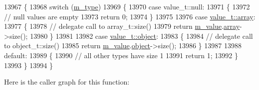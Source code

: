\begin{DoxyCode}
13967     \{
13968         \textcolor{keywordflow}{switch} (\hyperlink{classnlohmann_1_1basic__json_a91990b60d7d4d67968a2c1db677536e7}{m\_type})
13969         \{
13970             \textcolor{keywordflow}{case} value\_t::null:
13971             \{
13972                 \textcolor{comment}{// null values are empty}
13973                 \textcolor{keywordflow}{return} 0;
13974             \}
13975 
13976             \textcolor{keywordflow}{case} \hyperlink{namespacenlohmann_1_1detail_a1ed8fc6239da25abcaf681d30ace4985af1f713c9e000f5d3f280adbd124df4f5}{value\_t::array}:
13977             \{
13978                 \textcolor{comment}{// delegate call to array\_t::size()}
13979                 \textcolor{keywordflow}{return} \hyperlink{classnlohmann_1_1basic__json_aeb0814f76966f99290cb29e127c90a77}{m\_value}.\hyperlink{unionnlohmann_1_1basic__json_1_1json__value_a7947687f3ae1911d6e9847e2b3226157}{array}->size();
13980             \}
13981 
13982             \textcolor{keywordflow}{case} \hyperlink{namespacenlohmann_1_1detail_a1ed8fc6239da25abcaf681d30ace4985aa8cfde6331bd59eb2ac96f8911c4b666}{value\_t::object}:
13983             \{
13984                 \textcolor{comment}{// delegate call to object\_t::size()}
13985                 \textcolor{keywordflow}{return} \hyperlink{classnlohmann_1_1basic__json_aeb0814f76966f99290cb29e127c90a77}{m\_value}.\hyperlink{unionnlohmann_1_1basic__json_1_1json__value_a4a2209bb26e7088cd36bf24824ab5521}{object}->size();
13986             \}
13987 
13988             \textcolor{keywordflow}{default}:
13989             \{
13990                 \textcolor{comment}{// all other types have size 1}
13991                 \textcolor{keywordflow}{return} 1;
13992             \}
13993         \}
13994     \}
\end{DoxyCode}
Here is the caller graph for this function\+:
\mbox{\label{classnlohmann_1_1basic__json_a8c9d932353e1ab98a7dc2fc27e002031}} 
